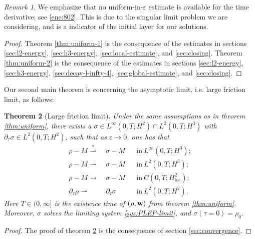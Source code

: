 \documentclass[11pt]{article}
\theoremstyle{plain}
\newtheorem{theorem}{Theorem}[section]
\theoremstyle{definition}
\theoremstyle{remark}
\newtheorem{remark}[theorem]{Remark}
\newcommand{\mrm}[1]{\mathrm{#1}}
\newcommand{\dtau}{\partial_\tau}
\renewcommand{\vec}[1]{{\bf #1}}
\numberwithin{equation}{section}
\begin{document}
\begin{remark}
    We emphasize that no uniform-in-$ \varepsilon $ estimate is available for the time derivative; see \eqref{ene:802}. This is due to the singular limit problem we are considering, and is a indicator of the initial layer for our solutions. 
\end{remark}

\begin{proof}
    Theorem \ref{thm:uniform-1} is the consequence of the estimates in sections \ref{sec:l2-energy}, \ref{sec:h3-energy}, \ref{sec:local-estimate}, and \ref{sec:closing}. Theorem \ref{thm:uniform-2} is the consequence of the estimates in sections \ref{sec:l2-energy}, \ref{sec:h3-energy}, \ref{sec:decay-l-infty-4}, \ref{sec:global-estimate}, and \ref{sec:closing}. 
\end{proof}

Our second main theorem is concerning the asymptotic limit, i.e. large friction limit, as follows: 

\begin{theorem}[Large friction limit]
    \label{thm:limit}
    Under the same assumptions as in theorem \ref{thm:uniform}, there exists a $ \sigma \in L^\infty(0,T;H^2)\cap L^2(0,T;H^3) $ with $ \dtau \sigma \in L^2(0,T;H^2) $, such that as $ \varepsilon \rightarrow 0 $, one has that 
\begin{align}
    \label{thm:limit-1}
    \rho - M  \stackrel{*}{\rightharpoonup} & ~ \sigma - M && \text{in} ~ L^\infty(0,T;H^3);\\
    \label{thm:limit-2}
    \rho - M {\rightharpoonup} & ~ \sigma - M && \text{in} ~ L^2(0,T;H^3); \\
    \label{thm:limit-3}
    \rho - M \rightarrow & ~ \sigma - M && \text{in} ~ C(0,T;H^2_\mrm{loc}); \\
    \label{thm:limit-4}
    \dtau \rho \rightharpoonup & ~ \dtau \sigma && \text{in} ~ L^2(0,T;H^2).
\end{align}
Here $ T \in (0,\infty] $ is the existence time of $ (\rho,\vec w) $ from theorem \ref{thm:uniform}. Moreover, $ \sigma $ solves the limiting system \eqref{sys:PLEP-limit}, and $ \sigma(\tau = 0) = \rho_0 $. 
    
\end{theorem}

\begin{proof}
    The proof of theorem \ref{thm:limit} is the consequence of section \ref{sec:convergence}.
\end{proof}
\end{document}
